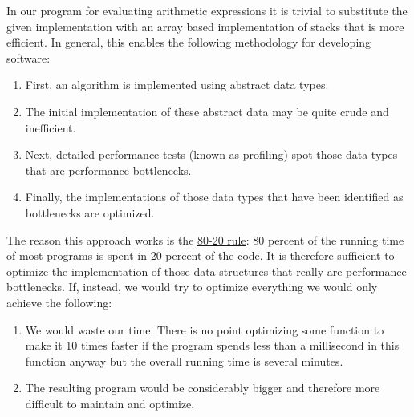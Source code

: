 \begin{enumerate}
       In our program for evaluating  arithmetic expressions it is trivial to substitute the given
       implementation with an array based implementation of stacks that is more efficient.  In general,
       this enables the following methodology for developing software:  
       \begin{enumerate}
       \item First, an algorithm is implemented using abstract data types.
       \item The initial implementation of these abstract data may be quite crude and inefficient.
       \item Next, detailed performance tests (known as 
             \href{http://en.wikipedia.org/wiki/Profiling_(computer_programming)}{profiling)}
             spot those data types that are performance bottlenecks.
       \item Finally, the implementations of those data types that have been identified as bottlenecks are optimized.
       \end{enumerate}
       The reason this approach works is the 
       \href{http://en.wikipedia.org/wiki/Pareto_principle#In_software}{80-20 rule}:  
       80 percent of the running time of most programs is spent in 20 percent of the code.  It is
       therefore sufficient to optimize the 
       implementation of those data structures that really are performance bottlenecks.  If,
       instead, we would try to optimize everything we would only achieve the following:
       \begin{enumerate}
       \item We would waste our time.  There is no point optimizing some function to make it 10 times
             faster if the program spends less than a millisecond in this function anyway but the
             overall running time is several minutes.
       \item The resulting program would be considerably bigger and therefore more difficult to 
             maintain and optimize.
       \end{enumerate}
 \end{enumerate}

